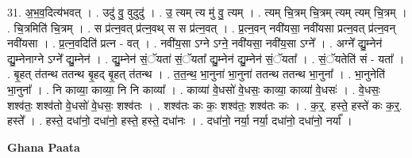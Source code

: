 \documentclass[17pt]{extarticle}
\begin{document}
31. अ॒भ॒व॒दित्य॑भवत् । . उदु॑ वु॒ वुदुदु॑ । . उ॒ त्यम् त्य मु॑ वु॒ त्यम् । . त्यम् चि॒त्रम् चि॒त्रम् त्यम् त्यम् चि॒त्रम् । . चि॒त्रमिति॑ चि॒त्रम् । . स प्र॑त्न॒वत् प्र॑त्न॒वथ् स स प्र॑त्न॒वत् । . प्र॒त्न॒वन् नवी॑यसा॒ नवी॑यसा प्रत्न॒वत् प्र॑त्न॒वन् नवी॑यसा । . प्र॒त्न॒वदिति॑ प्रत्न - वत् । . नवी॑य॒सा ऽग्ने ऽग्ने॒ नवी॑यसा॒ नवी॑य॒सा ऽग्ने᳚ । . अग्ने᳚ द्यु॒म्नेन॑ द्यु॒म्नेनाग्ने ऽग्ने᳚ द्यु॒म्नेन॑ । . द्यु॒म्नेन॑ सं॒ॅयता॑ सं॒ॅयता᳚ द्यु॒म्नेन॑ द्यु॒म्नेन॑ सं॒ॅयता᳚ । . सं॒ॅयतेति॑ सं - यता᳚ । . बृ॒हत् त॑तन्थ ततन्थ बृ॒हद् बृ॒हत् त॑तन्थ । . त॒त॒न्थ॒ भा॒नुना॑ भा॒नुना॑ ततन्थ ततन्थ भा॒नुना᳚ । . भा॒नुनेति॑ भा॒नुना᳚ । . नि काव्या॒ काव्या॒ नि नि काव्या᳚ । . काव्या॑ वे॒धसो॑ वे॒धसः॒ काव्या॒ काव्या॑ वे॒धसः॑ । . वे॒धसः॒ शश्व॑तः॒ शश्व॑तो वे॒धसो॑ वे॒धसः॒ शश्व॑तः । . शश्व॑तः कः कः॒ शश्व॑तः॒ शश्व॑तः कः । . क॒र्॒. हस्ते॒ हस्ते॑ कः क॒र्॒. हस्ते᳚ । . हस्ते॒ दधा॑नो॒ दधा॑नो॒ हस्ते॒ हस्ते॒ दधा॑नः । . दधा॑नो॒ नर्या॒ नर्या॒ दधा॑नो॒ दधा॑नो॒ नर्या᳚ । \newline

\textbf{Ghana Paata } \newline
\end{document}
